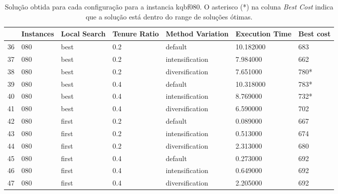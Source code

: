 \begin{table}
\centering
\begin{tabular}{lllllll}
\toprule
{} & Instances & Local Search & Tenure Ratio & Method Variation & Execution Time & Best cost \\
\midrule
36 &       080 &         best &          0.2 &          default &    10.182000 &       683 \\
37 &       080 &         best &          0.2 &  intensification &     7.984000 &       662 \\
38 &       080 &         best &          0.2 &  diversification &     7.651000 &       780* \\
39 &       080 &         best &          0.4 &          default &    10.318000 &       783* \\
40 &       080 &         best &          0.4 &  intensification &     8.769000 &       732* \\
41 &       080 &         best &          0.4 &  diversification &     6.590000 &       702 \\
42 &       080 &        first &          0.2 &          default &     0.089000 &       667 \\
43 &       080 &        first &          0.2 &  intensification &     0.513000 &       674 \\
44 &       080 &        first &          0.2 &  diversification &     2.313000 &       680 \\
45 &       080 &        first &          0.4 &          default &     0.273000 &       692 \\
46 &       080 &        first &          0.4 &  intensification &     0.649000 &       692 \\
47 &       080 &        first &          0.4 &  diversification &     2.205000 &       692 \\
\bottomrule
\end{tabular}
\caption{Solução obtida para cada configuração para a instancia kqbf080. O asterisco (*) na coluna \textit{Best Cost} indica que a solução está dentro do range de soluções ótimas.}
\label{table:all-data-3}
\end{table}

